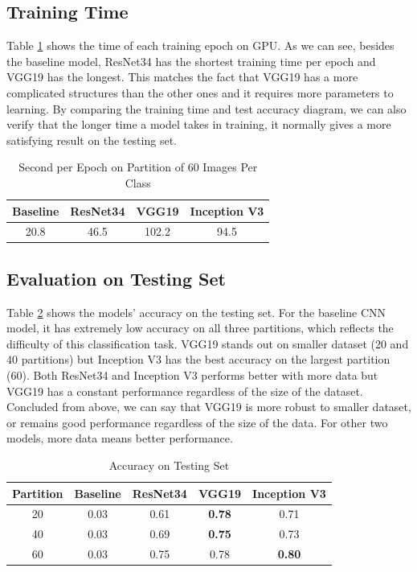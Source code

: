 \documentclass{article}
\begin{document}
\subsection{Training Time}
Table \ref{tab:spe} shows the time of each training epoch on GPU. As we can see, besides the baseline model, ResNet34 has the shortest training time per epoch and VGG19 has the longest. This matches the fact that VGG19 has a more complicated structures than the other ones and it requires more parameters to learning. By comparing the training time and test accuracy diagram, we can also verify that the longer time a model takes in training, it normally gives a more satisfying result on the testing set.

\begin{table}[h!]
    \centering
    \begin{tabular}{cccc}
         Baseline &  ResNet34 & VGG19 & Inception V3 \\
         \hline
         20.8 & 46.5 & 102.2 & 94.5 \\  
    \end{tabular}
    \caption{Second per Epoch on Partition of 60 Images Per Class}
    \label{tab:spe}
\end{table}

\subsection{Evaluation on Testing Set}
Table \ref{tab:test_acc} shows the models' accuracy on the testing set. For the baseline CNN model, it has extremely low accuracy on all three partitions, which reflects the difficulty of this classification task. VGG19 stands out on smaller dataset (20 and 40 partitions) but Inception V3 has the best accuracy on the largest partition (60). Both ResNet34 and Inception V3 performs better with more data but VGG19 has a constant performance regardless of the size of the dataset. Concluded from above, we can say that VGG19 is more robust to smaller dataset, or remains good performance regardless of the size of the data. For other two models, more data means better performance.
\begin{table}[h!]
    \centering
    \begin{tabular}{c|cccc}
        Partition & Baseline & ResNet34 & VGG19 & Inception V3 \\
        \hline 
        20 & 0.03 & 0.61 & \textbf{0.78} & 0.71 \\
        40 & 0.03 & 0.69 & \textbf{0.75} & 0.73 \\
        60 & 0.03 & 0.75 & 0.78 & \textbf{0.80}  
    \end{tabular}
    \caption{Accuracy on Testing Set}
    \label{tab:test_acc}
\end{table}
\end{document}
